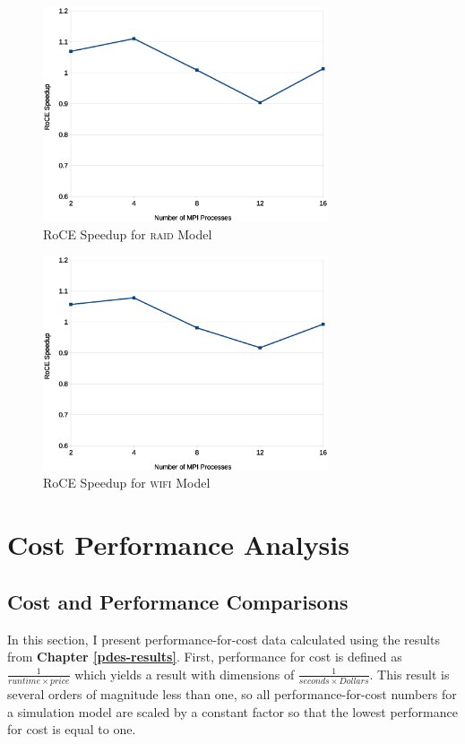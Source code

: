 \documentclass[11pt]{book}
\begin{document}
\begin{figure}
\centering
\includegraphics[width=0.75\textwidth]{raid_speedup}
\caption{RoCE Speedup for \textsc{raid} Model}
\label{raid-speedup}
\end{figure}

\begin{figure}
\centering
\includegraphics[width=0.75\textwidth]{wifi_speedup}
\caption{RoCE Speedup for \textsc{wifi} Model}
\label{wifi-speedup}
\end{figure}


\chapter{Cost Performance Analysis}\label{analysis}

\section{\textbf{Cost and Performance Comparisons}}

In this section, I present performance-for-cost data calculated using the
results from \textbf{Chapter \ref{pdes-results}}. First, performance for cost is
defined as $\frac{1}{runtime \times price}$ which yields a result with
dimensions of $\frac{1}{seconds \times Dollars}$. This result is several orders
of magnitude less than one, so all performance-for-cost numbers for a simulation
model are scaled by a constant factor so that the lowest performance for cost is
equal to one.
\end{document}
